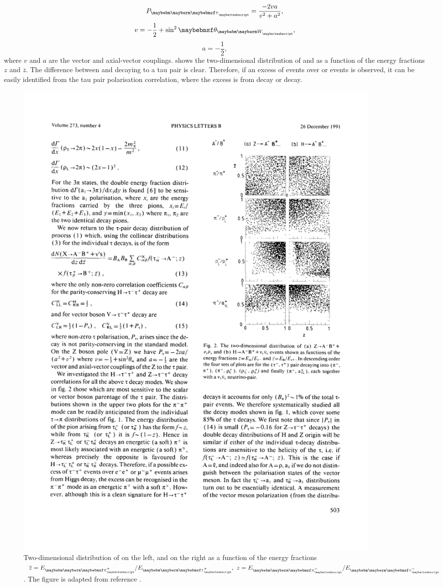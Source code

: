 \begin{equation}
P_{\Ptau} = \frac{-2va}{v^2 + a^2},
\end{equation}
\begin{equation}
v = -\frac{1}{2} + \sin^2{\theta_{\PW}},
\end{equation}
\begin{equation}
a = -\frac{1}{2},
\end{equation}
where $v$ and $a$ are the vector and axial-vector \ZTauTau couplings.  shows the two-dimensional distribution of \ZToTauTau and \HiggsToTauTau as a function of the energy fractions $z$ and $\overline{z}$. The difference between \PZ and \PHiggs decaying to a tau pair is clear. Therefore, if an excess of \TauTau events over \ee or \MuMu events is observed, it can be easily identified from the tau pair polarisation correlation, where the excess is from \PHiggs decay or \PZ decay.

\begin{figure}[htbp]
\centering %
\includegraphics[width=0.9\textwidth]{theory/TauPairCorrelation}

\caption[Two-dimensional distribution of \ZToTauTau and \HiggsToTauTau.]
{Two-dimensional distribution of \ZToTauTau on the left, and \HiggsToTauTau on the right as a function of the energy fractions $\overline{z} = {E_{\Ppiplus}}/{E_{\APtauon}},\ z = {E_{\Ppiminus}}/{E_{\Ptauon}}$. The figure is adapted from reference \cite{Tsai:1971vv}.}
\label{fig:theoryTauPairCorrelation}
\end{figure} 